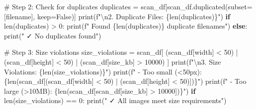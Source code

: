 \documentclass[
  letterpaper,
  DIV=11,
  numbers=noendperiod]{scrartcl}
\newenvironment{Shaded}{\begin{snugshade}}{\end{snugshade}}
\newcommand{\BuiltInTok}[1]{\textcolor[rgb]{0.00,0.23,0.31}{#1}}
\newcommand{\CharTok}[1]{\textcolor[rgb]{0.13,0.47,0.30}{#1}}
\newcommand{\CommentTok}[1]{\textcolor[rgb]{0.37,0.37,0.37}{#1}}
\newcommand{\ControlFlowTok}[1]{\textcolor[rgb]{0.00,0.23,0.31}{\textbf{#1}}}
\newcommand{\DecValTok}[1]{\textcolor[rgb]{0.68,0.00,0.00}{#1}}
\newcommand{\NormalTok}[1]{\textcolor[rgb]{0.00,0.23,0.31}{#1}}
\newcommand{\OperatorTok}[1]{\textcolor[rgb]{0.37,0.37,0.37}{#1}}
\newcommand{\SpecialCharTok}[1]{\textcolor[rgb]{0.37,0.37,0.37}{#1}}
\newcommand{\SpecialStringTok}[1]{\textcolor[rgb]{0.13,0.47,0.30}{#1}}
\newcommand{\StringTok}[1]{\textcolor[rgb]{0.13,0.47,0.30}{#1}}
\newcommand{\VariableTok}[1]{\textcolor[rgb]{0.07,0.07,0.07}{#1}}
\renewenvironment{Shaded}{%
  \begin{tcolorbox}[%
    enhanced,%
    colback=codebg,%
    colframe=codebg,%
    borderline west={3pt}{0pt}{sectionblue},%
    boxrule=0pt,%
    arc=0pt,%
    boxsep=5pt,%
    left=2mm,%
    right=2mm,%
    top=2mm,%
    bottom=2mm%
  ]%
}{%
  \end{tcolorbox}%
}
\begin{document}
\begin{Shaded}
\begin{Highlighting}[]
\CommentTok{\# Step 2: Check for duplicates}
\NormalTok{duplicates }\OperatorTok{=}\NormalTok{ scan\_df[scan\_df.duplicated(subset}\OperatorTok{=}\NormalTok{[}\StringTok{\textquotesingle{}filename\textquotesingle{}}\NormalTok{], keep}\OperatorTok{=}\VariableTok{False}\NormalTok{)]}
\BuiltInTok{print}\NormalTok{(}\SpecialStringTok{f"}\CharTok{\textbackslash{}n}\SpecialStringTok{2. Duplicate Files: }\SpecialCharTok{\{}\BuiltInTok{len}\NormalTok{(duplicates)}\SpecialCharTok{\}}\SpecialStringTok{"}\NormalTok{)}
\ControlFlowTok{if} \BuiltInTok{len}\NormalTok{(duplicates) }\OperatorTok{\textgreater{}} \DecValTok{0}\NormalTok{:}
    \BuiltInTok{print}\NormalTok{(}\SpecialStringTok{f"   Found }\SpecialCharTok{\{}\BuiltInTok{len}\NormalTok{(duplicates)}\SpecialCharTok{\}}\SpecialStringTok{ duplicate filenames"}\NormalTok{)}
\ControlFlowTok{else}\NormalTok{:}
    \BuiltInTok{print}\NormalTok{(}\StringTok{"   ✓ No duplicates found"}\NormalTok{)}

\CommentTok{\# Step 3: Size violations}
\NormalTok{size\_violations }\OperatorTok{=}\NormalTok{ scan\_df[}
\NormalTok{    (scan\_df[}\StringTok{\textquotesingle{}width\textquotesingle{}}\NormalTok{] }\OperatorTok{\textless{}} \DecValTok{50}\NormalTok{) }\OperatorTok{|} 
\NormalTok{    (scan\_df[}\StringTok{\textquotesingle{}height\textquotesingle{}}\NormalTok{] }\OperatorTok{\textless{}} \DecValTok{50}\NormalTok{) }\OperatorTok{|} 
\NormalTok{    (scan\_df[}\StringTok{\textquotesingle{}size\_kb\textquotesingle{}}\NormalTok{] }\OperatorTok{\textgreater{}} \DecValTok{10000}\NormalTok{)}
\NormalTok{]}
\BuiltInTok{print}\NormalTok{(}\SpecialStringTok{f"}\CharTok{\textbackslash{}n}\SpecialStringTok{3. Size Violations: }\SpecialCharTok{\{}\BuiltInTok{len}\NormalTok{(size\_violations)}\SpecialCharTok{\}}\SpecialStringTok{"}\NormalTok{)}
\BuiltInTok{print}\NormalTok{(}\SpecialStringTok{f"   {-} Too small (\textless{}50px): }\SpecialCharTok{\{}\BuiltInTok{len}\NormalTok{(scan\_df[(scan\_df[}\StringTok{\textquotesingle{}width\textquotesingle{}}\NormalTok{] }\OperatorTok{\textless{}} \DecValTok{50}\NormalTok{) }\OperatorTok{|}\NormalTok{ (scan\_df[}\StringTok{\textquotesingle{}height\textquotesingle{}}\NormalTok{] }\OperatorTok{\textless{}} \DecValTok{50}\NormalTok{)])}\SpecialCharTok{\}}\SpecialStringTok{"}\NormalTok{)}
\BuiltInTok{print}\NormalTok{(}\SpecialStringTok{f"   {-} Too large (\textgreater{}10MB): }\SpecialCharTok{\{}\BuiltInTok{len}\NormalTok{(scan\_df[scan\_df[}\StringTok{\textquotesingle{}size\_kb\textquotesingle{}}\NormalTok{] }\OperatorTok{\textgreater{}} \DecValTok{10000}\NormalTok{])}\SpecialCharTok{\}}\SpecialStringTok{"}\NormalTok{)}
\ControlFlowTok{if} \BuiltInTok{len}\NormalTok{(size\_violations) }\OperatorTok{==} \DecValTok{0}\NormalTok{:}
    \BuiltInTok{print}\NormalTok{(}\StringTok{"   ✓ All images meet size requirements"}\NormalTok{)}


\end{Highlighting}
\end{Shaded}
\end{document}
